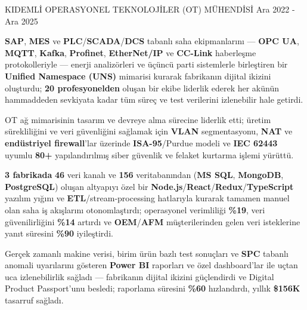 \begin{cventries}
  \cventry
    {KIDEMLİ OPERASYONEL TEKNOLOJİLER (OT) MÜHENDİSİ} %
    {} %
    {} %
    {Ara 2022 - Ara 2025} %
    {
      \begin{cvitems} %
        \item {\textbf{SAP}, \textbf{MES} ve \textbf{PLC}/\textbf{SCADA}/\textbf{DCS} tabanlı saha ekipmanlarını --- \textbf{OPC UA}, \textbf{MQTT}, \textbf{Kafka}, \textbf{Profinet}, \textbf{EtherNet/IP} ve \textbf{CC-Link} haberleşme protokolleriyle --- enerji analizörleri ve üçüncü parti sistemlerle birleştiren bir \textbf{Unified Namespace (UNS)} mimarisi kurarak fabrikanın dijital ikizini oluşturdu; \textbf{20 profesyonelden} oluşan bir ekibe liderlik ederek her akünün hammaddeden sevkiyata kadar tüm süreç ve test verilerini izlenebilir hale getirdi.}
        \item {OT ağ mimarisinin tasarım ve devreye alma sürecine liderlik etti; üretim sürekliliğini ve veri güvenliğini sağlamak için \textbf{VLAN} segmentasyonu, \textbf{NAT} ve \textbf{endüstriyel firewall}'lar üzerinde \textbf{ISA-95}/Purdue modeli ve \textbf{IEC 62443} uyumlu \textbf{80+} yapılandırılmış siber güvenlik ve felaket kurtarma işlemi yürüttü.}
        \item {\textbf{3 fabrikada} \textbf{46} veri kanalı ve \textbf{156} veritabanından (\textbf{MS SQL}, \textbf{MongoDB}, \textbf{PostgreSQL}) oluşan altyapıyı özel bir \textbf{Node.js}/\textbf{React}/\textbf{Redux}/\textbf{TypeScript} yazılım yığını ve \textbf{ETL}/stream-processing hatlarıyla kurarak tamamen manuel olan saha iş akışlarını otonomlaştırdı; operasyonel verimliliği \textbf{\%19}, veri güvenilirliğini \textbf{\%14} artırdı ve \textbf{OEM}/\textbf{AFM} müşterilerinden gelen veri isteklerine yanıt süresini \textbf{\%90} iyileştirdi.}
        \item {Gerçek zamanlı makine verisi, birim ürün bazlı test sonuçları ve \textbf{SPC} tabanlı anomali uyarılarını gösteren \textbf{Power BI} raporları ve özel dashboard'lar ile uçtan uca izlenebilirlik sağladı --- fabrikanın dijital ikizini güçlendirdi ve Digital Product Passport'unu besledi; raporlama süresini \textbf{\%60} hızlandırdı, yıllık \textbf{\$156K} tasarruf sağladı.}
      \end{cvitems}
    }

\end{cventries}

